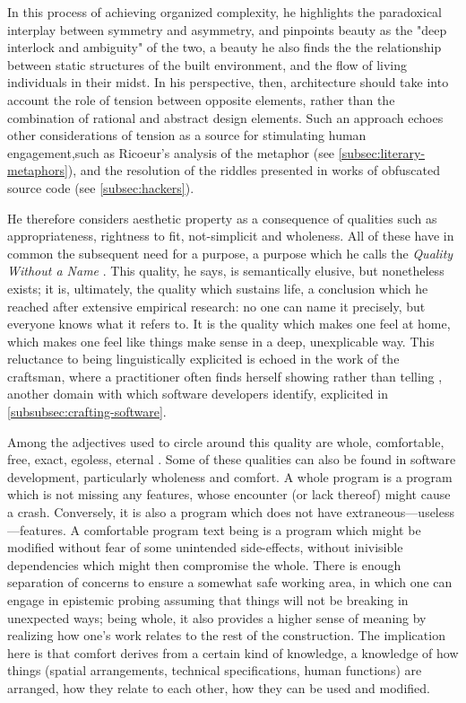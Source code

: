 In this process of achieving organized complexity, he highlights the paradoxical interplay between symmetry and asymmetry, and pinpoints beauty as the "deep interlock and ambiguity" of the two, a beauty he also finds the the relationship between static structures of the built environment, and the flow of living individuals in their midst. In his perspective, then, architecture should take into account the role of tension between opposite elements, rather than the combination of rational and abstract design elements. Such an approach echoes other considerations of tension as a source for stimulating human engagement,such as Ricoeur's analysis of the metaphor (see \ref{subsec:literary-metaphors}), and the resolution of the riddles presented in works of obfuscated source code (see \ref{subsec:hackers}).

He therefore considers aesthetic property as a consequence of qualities such as appropriateness, rightness to fit, not-simplicit and wholeness. All of these have in common the subsequent need for a purpose, a purpose which he calls the \emph{Quality Without a Name} \citep{alexander_timeless_1979}. This quality, he says, is semantically elusive, but nonetheless exists; it is, ultimately, the quality which sustains life, a conclusion which he reached after extensive empirical research: no one can name it precisely, but everyone knows what it refers to. It is the quality which makes one feel at home, which makes one feel like things make sense in a deep, unexplicable way. This reluctance to being linguistically explicited is echoed in the work of the craftsman, where a practitioner often finds herself showing rather than telling \citep{pye_nature_2008}, another domain with which software developers identify, explicited in \ref{subsubsec:crafting-software}.

Among the adjectives used to circle around this quality are whole, comfortable, free, exact, egoless, eternal \citep{alexander_timeless_1979}. Some of these qualities can also be found in software development, particularly wholeness and comfort. A whole program is a program which is not missing any features, whose encounter (or lack thereof) might cause a crash. Conversely, it is also a program which does not have extraneous—useless—features. A comfortable program text being is a program which might be modified without fear of some unintended side-effects, without inivisible dependencies which might then compromise the whole. There is enough separation of concerns to ensure a somewhat safe working area, in which one can engage in epistemic probing assuming that things will not be breaking in unexpected ways; being whole, it also provides a higher sense of meaning by realizing how one's work relates to the rest of the construction. The implication here is that comfort derives from a certain kind of knowledge, a knowledge of how things (spatial arrangements, technical specifications, human functions) are arranged, how they relate to each other, how they can be used and modified.

